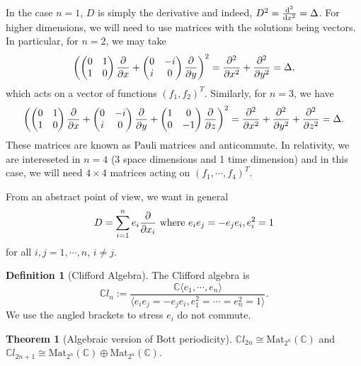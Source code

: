 \documentclass[]{article}
\theoremstyle{definition}
\newtheorem{theorem}{Theorem}
\theoremstyle{definition}
\newtheorem{definition}{Definition}[section]
\begin{document}
In the case \(n = 1\), \(D\) is simply the derivative and indeed, 
\(D^2 = \dv[2]{x} = \Delta\). For higher dimensions, we will need to use matrices 
with the solutions being vectors. In particular, for \(n = 2\), we may take 
\[\left(
  \begin{pmatrix}
    0 & 1 \\
    1 & 0
  \end{pmatrix}
  \pdv{x} +
  \begin{pmatrix}
    0 & -i \\
    i & 0
  \end{pmatrix}
  \pdv{y}
\right)^2 = 
  \pdv[2]{x} + \pdv[2]{y} = \Delta,\]
which acts on a vector of functions \((f_1, f_2)^T\). Similarly, 
for \(n = 3\), we have 
\[\left(
  \begin{pmatrix}
    0 & 1 \\
    1 & 0
  \end{pmatrix}
  \pdv{x} +
  \begin{pmatrix}
    0 & -i \\
    i & 0
  \end{pmatrix}
  \pdv{y} + 
  \begin{pmatrix}
    1 & 0 \\
    0 & -1
  \end{pmatrix}
  \pdv{z}
\right)^2 = 
  \pdv[2]{x} + \pdv[2]{y} + \pdv[2]{z} = \Delta.\]
These matrices are known as Pauli matrices and anticommute. In relativity, 
we are intereseted in \(n = 4\) (3 space dimensions and 1 time dimension) 
and in this case, we will need \(4 \times 4\) matrices acting on 
\((f_1, \cdots, f_4)^T\).

From an abstract point of view, we want in general 
\[D = \sum_{i = 1}^n e_i \pdv{x_i} \text{ where } e_i e_j = -e_je_i, e_i^2 = 1\]
for all \(i, j = 1, \cdots, n\), \(i \neq j\).

\begin{definition}[Clifford Algebra]
  The Clifford algebra is 
  \[\mathbb{C}l_n := \frac{\mathbb{C}\langle e_1, \cdots, e_n \rangle}{
    \langle e_i e_j = -e_j e_i, e_1^2 = \cdots = e_n^2 = 1 \rangle}.\]
  We use the angled brackets to stress \(e_i\) do not commute.
\end{definition}

\begin{theorem}[Algebraic version of Bott periodicity]
  \(\mathbb{C}l_{2n} \cong \text{Mat}_{2^n}(\mathbb{C})\) and 
  \(\mathbb{C}l_{2n + 1} \cong \text{Mat}_{2^n}(\mathbb{C}) \oplus 
  \text{Mat}_{2^n}(\mathbb{C})\).
\end{theorem}
\end{document}
